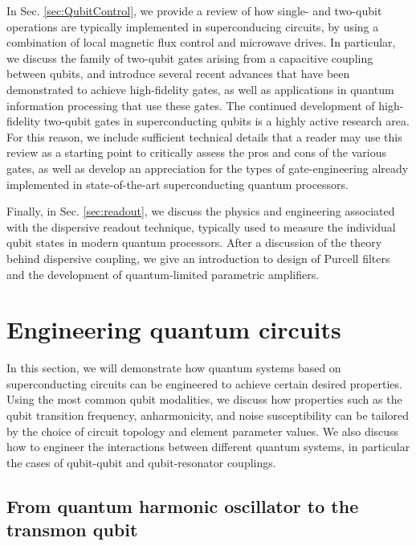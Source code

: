\documentclass[aip,apr,twocolumn,showpacs,superscriptaddress,groupedaddress,nofootinbib,reprint]{revtex4-1}  %
\begin{document}
In Sec. \ref{sec:QubitControl}, we provide a review of how single- and two-qubit operations are typically implemented in superconducing circuits, by using a combination of local magnetic flux control and microwave drives. In particular, we discuss the family of two-qubit gates arising from a capacitive coupling between qubits, and introduce several recent advances that have been demonstrated to achieve high-fidelity gates, as well as applications in quantum information processing that use these gates. The continued development of high-fidelity two-qubit gates in superconducting qubits is a highly active research area. For this reason, we include sufficient technical details that a reader may use this review as a starting point to critically assess the pros and cons of the various gates, as well as develop an appreciation for the types of gate-engineering already implemented in state-of-the-art superconducting quantum processors.

Finally, in Sec. \ref{sec:readout}, we discuss the physics and engineering associated with the dispersive readout technique, typically used to measure the individual qubit states in modern quantum processors. After a discussion of the theory behind dispersive coupling, we give an introduction to design of Purcell filters and the development of quantum-limited parametric amplifiers.

\section{\label{sec:circuits}Engineering quantum circuits}

In this section, we will demonstrate how quantum systems based on superconducting circuits can be engineered to achieve certain desired properties. Using the most common qubit modalities, we discuss how properties such as the qubit transition frequency, anharmonicity, and noise susceptibility can be tailored by the choice of circuit topology and element parameter values. We also discuss how to engineer the interactions between different quantum systems, in particular the cases of qubit-qubit and qubit-resonator couplings.

\subsection{\label{sec:HOtoTransmon}From quantum harmonic oscillator to the transmon qubit}
\end{document}
